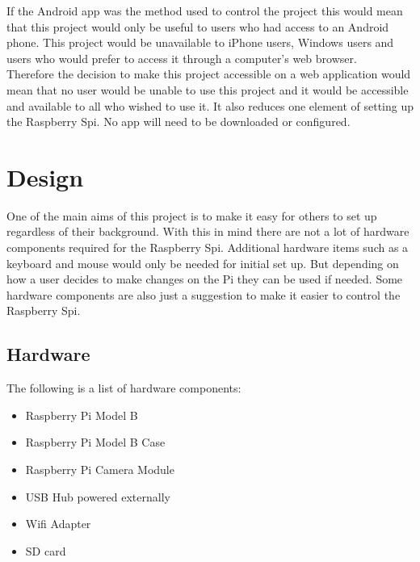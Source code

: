 \documentclass[]{report}
\begin{document}
If the Android app was the method used to control the project this would mean that this project would only be useful to users who had access to an Android phone. This project would be unavailable to iPhone users, Windows users and users who would prefer to access it through a computer's web browser.\\

Therefore the decision to make this project accessible on a web application would mean that no user would be unable to use this project and it would be accessible and available to all who wished to use it. It also reduces one element of setting up the Raspberry Spi. No app will need to be downloaded or configured.\\

% 
\chapter{Design}
\label{ch:design}
	One of the main aims of this project is to make it easy for others to set up regardless of their background. With this in mind there are not a lot of hardware components required for the Raspberry Spi. Additional hardware items such as a keyboard and mouse would only be needed for initial set up. But depending on how a user decides to make changes on the Pi they can be used if needed. Some hardware components are also just a suggestion to make it easier to control the Raspberry Spi. \\
	
\section{Hardware}	
\label{sec:hardware}

The following is a list of hardware components:\\
\begin{itemize}
  \item Raspberry Pi Model B\\
  \item Raspberry Pi Model B Case\\
  \item Raspberry Pi Camera Module\\
  \item USB Hub powered externally\\
  \item Wifi Adapter\\
  \item SD card\\
\end{itemize} 
\end{document}
